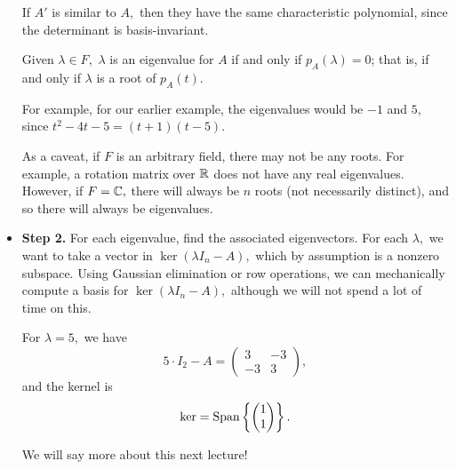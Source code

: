 \begin{itemize}
    If $A'$ is similar to $A,$ then they have the same characteristic polynomial, since the determinant is basis-invariant. 
    
    \begin{proposition}
    Given $\lambda \in F,$ $\lambda$ is an eigenvalue for $A$ if and only if $p_A(\lambda) = 0$; that is, if and only if $\lambda$ is a root of $p_A(t).$
    \end{proposition}
    
    For example, for our earlier example, the eigenvalues would be $-1$ and $5$, since $t^2 - 4t - 5 = (t + 1)(t - 5).$
    
    As a caveat, if $F$ is an arbitrary field, there may not be any roots. For example, a rotation matrix over $\mathbb R$ does not have any real eigenvalues. However, if $F = \mathbb C,$ there will always be $n$ roots (not necessarily distinct), and so there will always be eigenvalues. 
    
    \item \textbf{Step 2.} For each eigenvalue, find the associated eigenvectors. For each $\lambda,$ we want to take a vector in $\ker(\lambda I_n - A),$ which by assumption is a nonzero subspace. Using Gaussian elimination or row operations, we can mechanically compute a basis for $\ker(\lambda I_n - A),$ although we will not spend a lot of time on this. 
    
    \begin{example}
    For $\lambda = 5,$ we have \[5 \cdot I_2 - A = \begin{pmatrix} 3 & -3 \\ -3 & 3 \end{pmatrix},\] and the kernel is \[\ker = \text{Span} \left\{\begin{pmatrix} 1 \\ 1 \end{pmatrix}\right\}.\]
    \end{example}
    
    We will say more about this next lecture!
\end{itemize}

\newpage